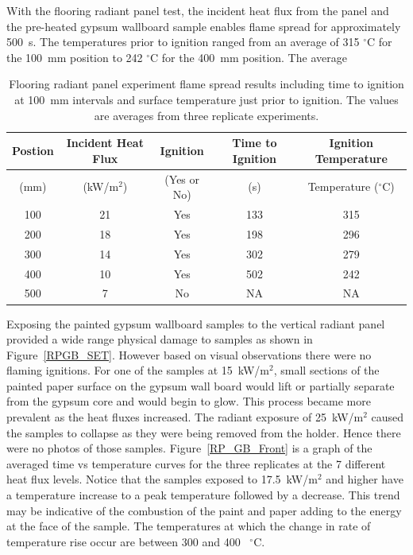 \documentclass[twoside]{uocthesis}
\begin{document}
 With the flooring radiant panel test, the incident heat flux from the panel and the pre-heated gypsum wallboard sample enables flame spread for approximately 500~s.  The temperatures prior to ignition ranged from an average of 315 $^{\circ}$C for the 100~mm position to 242 $^{\circ}$C for the 400~mm position.  The average     
 
      
\begin{table}
	\centering
	\begin{tabular}{|c|c|c|c|c|}
		\hline Postion & Incident Heat Flux & Ignition & Time to Ignition & Ignition Temperature \\
		\hline (mm) & (kW/m$^2$) & (Yes or No) & (s)  & Temperature ($^{\circ}$C)   \\
		\hline 100 	& 21	& Yes 	& 133	& 315 	 \\
		\hline 200	& 18 	& Yes 	& 198 	& 296 	 \\
		\hline 300	& 14	& Yes 	& 302 	& 279 	 \\
		\hline 400	& 10	& Yes 	& 502 	& 242 	 \\
		\hline 500	&  7	& No 	& NA 	& NA   	 \\
		\hline
	\end{tabular}
	\caption[Flooring radiant panel experiment flame spread results]{Flooring radiant panel experiment flame spread results including time to ignition at 100~mm intervals and surface temperature just prior to ignition.  The values are averages from three replicate experiments.}
	\label{tab:FRP_timetemp}
\end{table}


Exposing the painted gypsum wallboard samples to the vertical radiant panel provided a wide range physical damage to samples as shown in Figure~\ref{RPGB_SET}.  However based on visual observations there were no flaming ignitions.  For one of the samples at 15~kW/m$^2$, small sections of the painted paper surface on the gypsum wall board would lift or partially separate from the gypsum core and would begin to glow.  This process became more prevalent as the heat fluxes increased.  The radiant exposure of 25~kW/m$^2$ caused the samples to collapse as they were being removed from the holder.  Hence there were no photos of those samples.   Figure~\ref{RP_GB_Front} is a graph of the averaged time vs temperature curves for the three replicates at the 7 different heat flux levels.  Notice that the samples exposed to 17.5~kW/m$^2$ and higher have a temperature increase to a peak temperature followed by a decrease.  This trend may be indicative of the combustion of the paint and paper adding to the energy at the face of the sample. The temperatures at which the change in rate of temperature rise occur are between 300 and 400~ $^{\circ}$C.       
  
\end{document}
